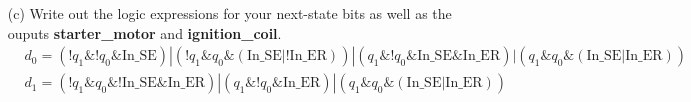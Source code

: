 \documentclass{article}
\theoremstyle{remark}
\theoremstyle{definition}
\begin{document}
\begin{enumerate}
        \item[(c)] Write out the logic expressions for your next-state bits as well as the ouputs \textbf{starter\_motor} and \textbf{ignition\_coil}.
        \begin{equation*}
            \begin{aligned}
                &d_0 = \left( !q_1 \& !q_0 \& \text{In\_SE} \right) | \left( !q_1 \& q_0 \& \left( \text{In\_SE} | !\text{In\_ER} \right) \right) | \left( q_1 \& !q_0 \& \text{In\_SE} \& \text{In\_ER} \right) | \left( q_1 \& q_0 \& \left( \text{In\_SE} | \text{In\_ER} \right) \right) \\
                &d_1 = \left( !q_1 \& q_0 \& !\text{In\_SE} \& \text{In\_ER} \right) | \left( q_1 \& !q_0 \& \text{In\_ER} \right) | \left( q_1 \& q_0 \& \left( \text{In\_SE} | \text{In\_ER} \right) \right)
            \end{aligned}
        \end{equation*}
    \end{enumerate}
\end{document}

